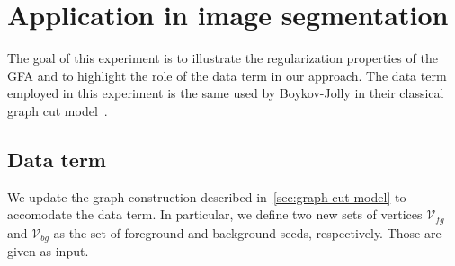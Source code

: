 \documentclass[review]{siamart220329}
\begin{document}



\section{Application in image segmentation}

The goal of this experiment is to illustrate the regularization properties of
the GFA and to highlight the role of the data term in our approach. The data
term employed in this experiment is the same used by Boykov-Jolly in their
classical graph cut model~\cite{boykov01graphcut}.

\subsection{Data term}
We update the graph construction described in~\cref{sec:graph-cut-model} to
accomodate the data term. In particular, we define two new sets of vertices
$\mathcal{V}_{fg}$ and $\mathcal{V}_{bg}$ as the set of foreground and
background seeds, respectively. Those are given as input.
\end{document}
